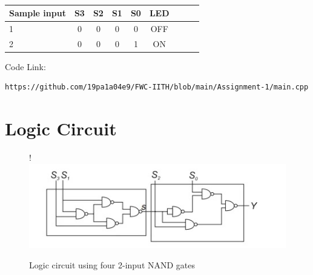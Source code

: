 \documentclass[10pt, a4paper]{article}
\begin{document}
\begin{table}[htbp]
 \begin{center}
    \begin{tabular}{|l|c|c|c|c|c|c|c|c} \hline \textbf{Sample input}
  & \textbf{S3} & \textbf{S2} & \textbf{S1}& \textbf{S0}& \textbf{LED } \\
 \hline
1&0&0&0&0&OFF\\ \hline
2&0&0&0&1&ON \\ \hline
\end{tabular}   
\end{center}
\caption{\label{table:dummytable} }
\end{table}
\vspace{3mm}
Code Link:
\begin{lstlisting}
https://github.com/19pa1a04e9/FWC-IITH/blob/main/Assignment-1/main.cpp
\end{lstlisting}
\pagebreak

\section{Logic Circuit}
\begin{figure}[!h]
\resizebox {\columnwidth} {!} {
\includegraphics[width=1\columnwidth]{Logic Circuit.jpg}
}
\caption{Logic circuit using four 2-input NAND gates}

\end{figure}
\end{document}
